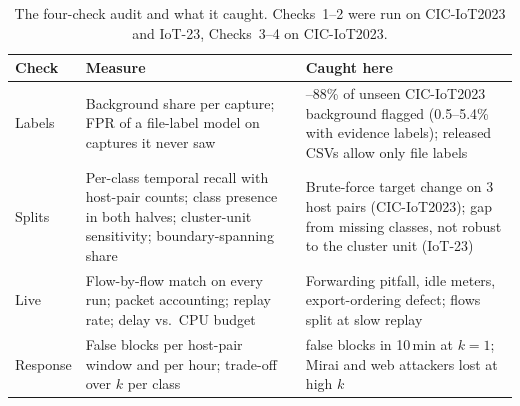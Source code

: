 \begin{table}[t]
\centering
\caption{The four-check audit and what it caught. Checks~1--2 were run on CIC-IoT2023 and IoT-23, Checks~3--4 on CIC-IoT2023.}
\label{tab:checklist}
\footnotesize
\setlength{\tabcolsep}{3pt}
\begin{tabular}{>{\raggedright\arraybackslash}p{1.1cm}>{\raggedright\arraybackslash}p{3.4cm}>{\raggedright\arraybackslash}p{3.5cm}}
\hline
Check & Measure & Caught here \\
\hline
1 Labels & Background share per capture; FPR of a file-label model on captures it never saw & 71--88\% of unseen CIC-IoT2023 background flagged (0.5--5.4\% with evidence labels); released CSVs allow only file labels \\
2 Splits & Per-class temporal recall with host-pair counts; class presence in both halves; cluster-unit sensitivity; boundary-spanning share & Brute-force target change on 3 host pairs (CIC-IoT2023); gap from missing classes, not robust to the cluster unit (IoT-23) \\
3 Live & Flow-by-flow match on every run; packet accounting; replay rate; delay vs.\ CPU budget & Forwarding pitfall, idle meters, export-ordering defect; flows split at slow replay \\
4 Response & False blocks per host-pair window and per hour; trade-off over $k$ per class & 60 false blocks in 10\,min at $k=1$; Mirai and web attackers lost at high $k$ \\
\hline
\end{tabular}
\end{table}
